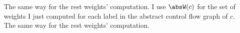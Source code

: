The same way for the rest weights' computation.
 I use $\absW(c)$ for the set of weights I just computed 
for each label in the abstract control flow graph of $c$.
%
The same way for the rest weights' computation.

